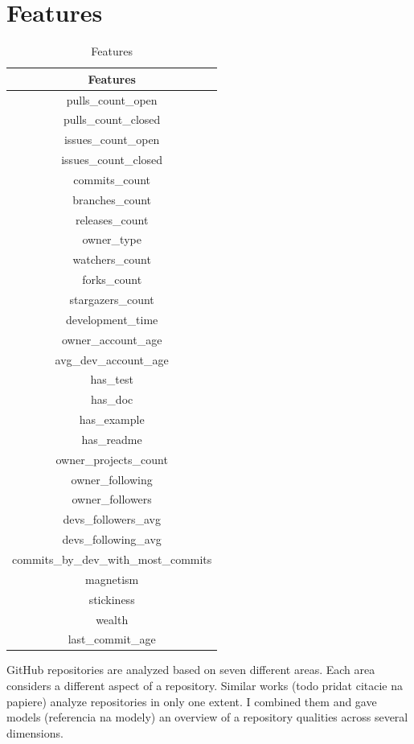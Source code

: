 \chapter{Features}
\label{chap-2:features}

\begin{table}
  \begin{tabular}{|c|}
    \toprule
    Features \\
    \midrule
    pulls\_count\_open \\
    pulls\_count\_closed \\
    issues\_count\_open \\
    issues\_count\_closed \\
    commits\_count \\
    branches\_count \\
    releases\_count \\
    owner\_type \\
    watchers\_count \\
    forks\_count \\
    stargazers\_count \\
    development\_time \\
    owner\_account\_age \\
    avg\_dev\_account\_age \\
    has\_test \\
    has\_doc \\
    has\_example \\
    has\_readme \\
    owner\_projects\_count \\
    owner\_following \\
    owner\_followers \\
    devs\_followers\_avg \\
    devs\_following\_avg \\
    commits\_by\_dev\_with\_most\_commits \\
    magnetism \\
    stickiness \\
    wealth \\
    last\_commit\_age \\
    \bottomrule
  \end{tabular}
  \caption{Features}
  \label{tab:features}
\end{table}

GitHub repositories are analyzed based on seven different areas.
Each area considers a different aspect of a repository.
Similar works (todo pridat citacie na papiere) analyze repositories in only one extent.
I combined them and gave models (referencia na modely) an overview of a repository qualities across several dimensions. 

